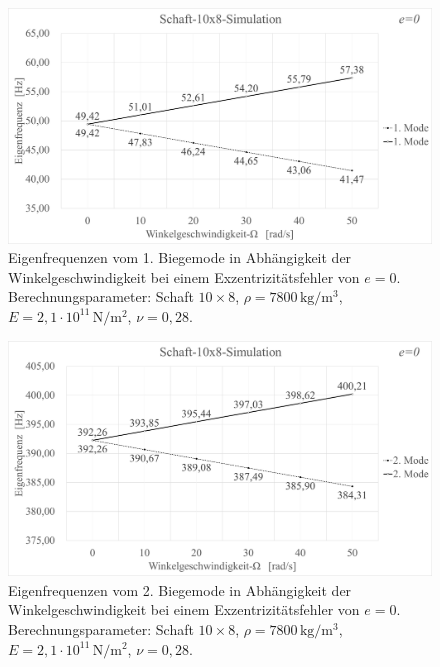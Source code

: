 	\begin{figure}[H]
		\centering
		\includegraphics[width=0.95\linewidth, height=0.35\textheight]{Ergebnisse/Schaft_10x8_1Mode_Simu}
		\caption{Eigenfrequenzen vom 1. Biegemode in Abhängigkeit der Winkelgeschwindigkeit bei einem Exzentrizitätsfehler von $ e=0 $. Berechnungsparameter: Schaft $ 10\times8 $, $\rho = 7800 \,\text{kg}/\text{m}^{3} $, $ E=2,1\cdot 10^{11} \,\text{N}/\text{m}^{2} $, $ \nu=0,28 $.}
		\label{fig:Result-Schaft-10x8-Simulation-1-Mode}
	\end{figure}

	\begin{figure}[H]
		\centering
		\includegraphics[width=0.95\linewidth, height=0.36\textheight]{Ergebnisse/Schaft_10x8_2Mode_Simu}
		\caption{Eigenfrequenzen vom 2. Biegemode in Abhängigkeit der Winkelgeschwindigkeit bei einem Exzentrizitätsfehler von $ e=0 $. Berechnungsparameter: Schaft $ 10\times8 $, $\rho = 7800 \,\text{kg}/\text{m}^{3} $, $ E=2,1\cdot 10^{11} \,\text{N}/\text{m}^{2} $, $ \nu=0,28 $.}
		\label{fig:Result-Schaft-10x8-Simulation-2-Mode}
	\end{figure}

